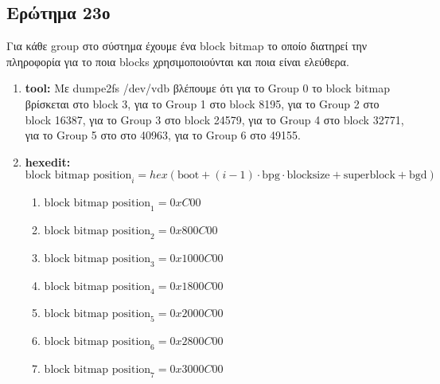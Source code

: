 \documentclass{article}
\begin{document}
\subsection{Ερώτημα 23ο}
Για κάθε group στο σύστημα έχουμε ένα block bitmap το οποίο διατηρεί την πληροφορία για το
ποια blocks χρησιμοποιούνται και ποια είναι ελεύθερα.\\

\begin{enumerate}
    \item{\textbf{tool:} Με dumpe2fs /dev/vdb βλέπουμε ότι για το Group 0 το block bitmap βρίσκεται στο block 3, για το 
        Group 1 στο block 8195, για το Group 2 στο block 16387, για το Group 3 στο block 24579, για το Group 4 στο block 32771,
        για το Group 5 στο στο 40963, για το Group 6 στο 49155.}
    \item{\textbf{hexedit:} $\text{block bitmap position}_{i} = hex(\text{boot}+(i-1)\cdot\text{bpg}\cdot \text{blocksize}
            + \text{superblock} + \text{bgd})$
    \begin{enumerate}
            \item{$\text{block bitmap position}_{1} = 0xC00$}
            \item{$\text{block bitmap position}_{2} = 0x800C00$}
            \item{$\text{block bitmap position}_{3} = 0x1000C00$}
            \item{$\text{block bitmap position}_{4} = 0x1800C00$}
            \item{$\text{block bitmap position}_{5} = 0x2000C00$}
            \item{$\text{block bitmap position}_{6} = 0x2800C00$}
            \item{$\text{block bitmap position}_{7} = 0x3000C00$}
    \end{enumerate}}
\end{enumerate}
\end{document}
